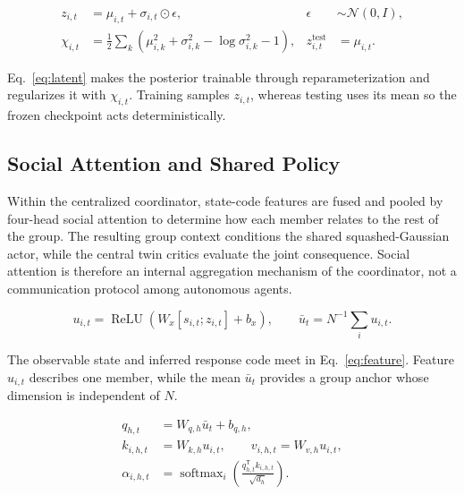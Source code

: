 \documentclass[journal]{IEEEtran}
\newcommand{\eqnote}[1]{\par\vspace{-0.3ex}\noindent #1\par\vspace{0.4ex}}
\begin{document}
\begin{equation}
\begin{aligned}
z_{i,t}&=\mu_{i,t}+\sigma_{i,t}\odot\epsilon,
&\epsilon&\sim\mathcal N(0,I),\\
\chi_{i,t}&=\frac12\sum_k\left(\mu_{i,k}^2+\sigma_{i,k}^2
-\log\sigma_{i,k}^2-1\right),
&z_{i,t}^{\mathrm{test}}&=\mu_{i,t}.
\end{aligned}
\label{eq:latent}
\end{equation}

\eqnote{Eq.~\eqref{eq:latent} makes the posterior trainable through reparameterization and regularizes it with $\chi_{i,t}$. Training samples $z_{i,t}$, whereas testing uses its mean so the frozen checkpoint acts deterministically.}

\subsection{Social Attention and Shared Policy}

Within the centralized coordinator, state-code features are fused and pooled by four-head social attention to determine how each member relates to the rest of the group. The resulting group context conditions the shared squashed-Gaussian actor, while the central twin critics evaluate the joint consequence. Social attention is therefore an internal aggregation mechanism of the coordinator, not a communication protocol among autonomous agents.

\begin{equation}
u_{i,t}=\operatorname{ReLU}(W_x[s_{i,t};z_{i,t}]+b_x),
\qquad \bar u_t=N^{-1}\sum_i u_{i,t}.
\label{eq:feature}
\end{equation}

\eqnote{The observable state and inferred response code meet in Eq.~\eqref{eq:feature}. Feature $u_{i,t}$ describes one member, while the mean $\bar u_t$ provides a group anchor whose dimension is independent of $N$.}

\begin{equation}
\begin{aligned}
q_{h,t}&=W_{q,h}\bar u_t+b_{q,h},\\
k_{i,h,t}&=W_{k,h}u_{i,t},\qquad
v_{i,h,t}=W_{v,h}u_{i,t},\\
\alpha_{i,h,t}&=\operatorname{softmax}_i
\left(\frac{q_{h,t}^{\mathsf T}k_{i,h,t}}{\sqrt{d_h}}\right).
\end{aligned}
\label{eq:attention}
\end{equation}
\end{document}
